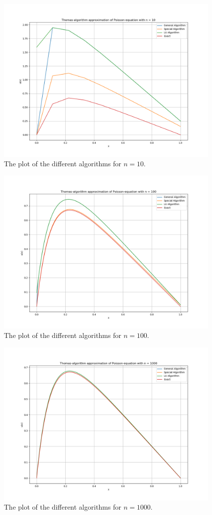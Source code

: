 \documentclass{article}
\begin{document}
\begin{figure}[ht]
	\centering
	\includegraphics[width = 11cm]{program/data10.png}
	\caption{The plot of the different algorithms for $n = 10$. }
  \label{fig:data10png}
\end{figure}

\begin{figure}[ht]
	\centering
	\includegraphics[width = 11cm]{program/data100.png}
	\caption{The plot of the different algorithms for $n = 100$. }
  \label{fig:data100png}
\end{figure}

\begin{figure}[ht]
	\centering
	\includegraphics[width = 11cm]{program/data1000.png}
	\caption{The plot of the different algorithms for $n = 1000$. }
  \label{fig:data1000png}
\end{figure}
\end{document}
